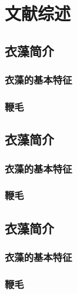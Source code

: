 \chapter{文献综述}
\renewcommand{\leftmark}{第二章\quad 文献综述}
\renewcommand{\figurename}{图}
\blindtext

\section{衣藻简介}
\subsection{衣藻的基本特征}
\Blindtext

\subsection{鞭毛}
\Blindtext

\section{衣藻简介}
\subsection{衣藻的基本特征}
\Blindtext

\subsection{鞭毛}
\Blindtext

\section{衣藻简介}
\subsection{衣藻的基本特征}
\Blindtext

\subsection{鞭毛}
\Blindtext

